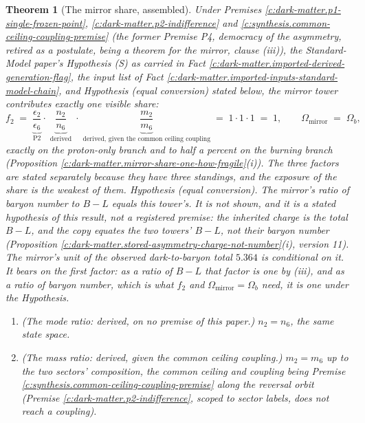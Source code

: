 \documentclass[11pt]{article}
\newtheorem{theorem}{Theorem}[section]
\theoremstyle{definition}
\theoremstyle{plain}
\newcommand{\changedmark}[2]{\marginpar{\raggedright\scriptsize\color{#1}#2}}
\begin{document}
\begin{theorem}[The mirror share, assembled]\label{c:dark-matter.mirror-share-assembled}
\changedmark{BurntOrange}{changed since the deposit}
Under Premises \ref{c:dark-matter.p1-single-frozen-point}, \ref{c:dark-matter.p2-indifference} and \ref{c:synthesis.common-ceiling-coupling-premise} (the former Premise P4, democracy of the asymmetry, retired as a postulate, being a theorem for the mirror, clause (iii)), the Standard-Model paper's Hypothesis (S) as carried in Fact \ref{c:dark-matter.imported-derived-generation-flag}, the input list of Fact \ref{c:dark-matter.imported-inputs-standard-model-chain}, and Hypothesis (equal conversion) stated below, the mirror tower contributes exactly one visible share:
\[
f_{2} \;=\; \underbrace{\frac{\epsilon_{2}}{\epsilon_{6}}}_{\text{P2}}\cdot\;\underbrace{\frac{n_{2}}{n_{6}}}_{\text{derived}}\;\cdot\;\underbrace{\frac{m_{2}}{m_{6}}}_{\text{derived, given the common ceiling coupling}} \;=\; 1\cdot 1\cdot 1 \;=\; 1, \qquad \Omega_{\mathrm{mirror}} \;=\; \Omega_{b},
\]
exactly on the proton-only branch and to half a percent on the burning branch (Proposition \ref{c:dark-matter.mirror-share-one-how-fragile}(i)). The three factors are stated separately because they have three standings, and the exposure of the share is the weakest of them. \emph{Hypothesis (equal conversion).} The mirror's ratio of baryon number to $B - L$ equals this tower's. It is not shown, and it is a stated hypothesis of this result, not a registered premise: the inherited charge is the total $B - L$, and the copy equates the two towers' $B - L$, not their baryon number (Proposition \ref{c:dark-matter.stored-asymmetry-charge-not-number}(i), version 11). The mirror's unit of the observed dark-to-baryon total $5.364$ is conditional on it. It bears on the first factor: as a ratio of $B - L$ that factor is one by (iii), and as a ratio of baryon number, which is what $f_{2}$ and $\Omega_{\mathrm{mirror}} = \Omega_{b}$ need, it is one under the Hypothesis.
\begin{enumerate}
\item[(i)] \emph{(The mode ratio: derived, on no premise of this paper.)} $n_{2} = n_{6}$, the same state space.
\item[(ii)] \emph{(The mass ratio: derived, given the common ceiling coupling.)} $m_{2} = m_{6}$ up to the two sectors' composition, the common ceiling and coupling being Premise \ref{c:synthesis.common-ceiling-coupling-premise} along the reversal orbit (Premise \ref{c:dark-matter.p2-indifference}, scoped to sector labels, does not reach a coupling).

\end{enumerate}
\end{theorem}
\end{document}
